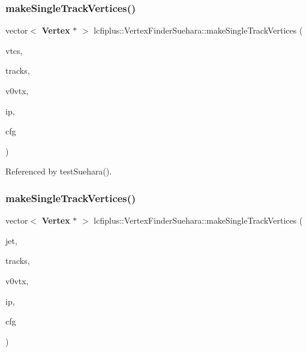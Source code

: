 \subsubsection{make\+Single\+Track\+Vertices()\hspace{0.1cm}{\footnotesize\ttfamily [1/2]}}
{\footnotesize\ttfamily vector$<$ \textbf{ Vertex} $\ast$ $>$ lcfiplus\+::\+Vertex\+Finder\+Suehara\+::make\+Single\+Track\+Vertices (\begin{DoxyParamCaption}\item[{\textbf{ Vertex\+Vec} \&}]{vtcs,  }\item[{\textbf{ Track\+Vec} \&}]{tracks,  }\item[{\textbf{ Vertex\+Vec} \&}]{v0vtx,  }\item[{const \textbf{ Vertex} $\ast$}]{ip,  }\item[{\textbf{ Vertex\+Finder\+Suehara\+Config} \&}]{cfg }\end{DoxyParamCaption})}



Referenced by test\+Suehara().

\mbox{\label{namespacelcfiplus_1_1VertexFinderSuehara_a18de0efc554dcce9ef6174fc70907dbc}} 
\subsubsection{make\+Single\+Track\+Vertices()\hspace{0.1cm}{\footnotesize\ttfamily [2/2]}}
{\footnotesize\ttfamily vector$<$ \textbf{ Vertex} $\ast$ $>$ lcfiplus\+::\+Vertex\+Finder\+Suehara\+::make\+Single\+Track\+Vertices (\begin{DoxyParamCaption}\item[{\textbf{ Jet} $\ast$}]{jet,  }\item[{\textbf{ Track\+Vec} \&}]{tracks,  }\item[{\textbf{ Vertex\+Vec} \&}]{v0vtx,  }\item[{const \textbf{ Vertex} $\ast$}]{ip,  }\item[{\textbf{ Vertex\+Finder\+Suehara\+Config} \&}]{cfg }\end{DoxyParamCaption})}

\mbox{\label{namespacelcfiplus_1_1VertexFinderSuehara_a67259687aac1da1330fadf50383636d5}} 
